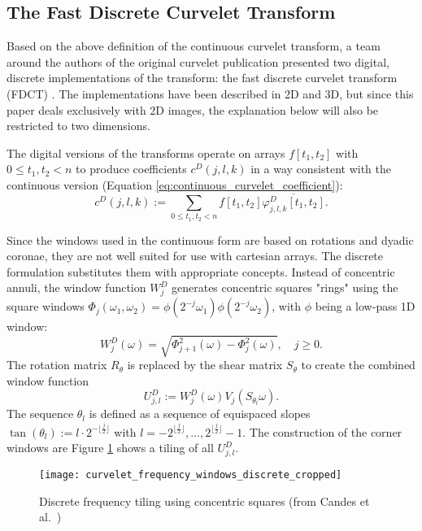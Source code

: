 \subsection{The Fast Discrete Curvelet Transform}\label{sec:background_fdct}

Based on the above definition of the continuous curvelet transform, a team
around the authors of the original curvelet publication presented two digital,
discrete implementations of the transform: the fast discrete curvelet transform
(FDCT) \autocite{candes_fast_2006}. The implementations have been described in
2D and 3D, but since this paper deals exclusively with 2D images, the
explanation below will also be restricted to two dimensions.

The digital versions of the transforms operate on arrays $f[t_1, t_2]$ with $0
\leq t_1, t_2 < n$ to produce coefficients $c^D(j, l, k)$ in a way
consistent with the continuous version (Equation
\ref{eq:continuous_curvelet_coefficient}):
\begin{equation}
    c^D(j, l, k) := \sum_{0 \leq t_1, t_2 < n} f[t_1, t_2] \overline{\varphi_{j, l, k}^D[t_1, t_2]}.
\end{equation}

Since the windows used in the continuous form are based on rotations and dyadic
coronae, they are not well suited for use with cartesian arrays. The discrete
formulation substitutes them with appropriate concepts. Instead of concentric
annuli, the window function $W^D_j$ generates concentric squares "rings" using
the square windows $\Phi_j(\omega_1, \omega_2) = \phi(2^{-j}\omega_1)
\phi(2^{-j}\omega_2)$, with $\phi$ being a low-pass 1D window:
\begin{equation*}
    W_j^D(\omega) = \sqrt{\Phi_{j+1}^2(\omega) - \Phi_j^2(\omega)}, \quad j \geq 0.
\end{equation*}
The rotation matrix $R_{\theta}$ is replaced by the shear matrix $S_{\theta}$
to create the combined window function
\begin{equation*}
    U_{j, l}^D := W_j^D(\omega) V_j(S_{\theta_l}\omega).
\end{equation*}
The sequence $\theta_l$ is defined as a sequence of equispaced slopes
$\tan(\theta_l) := l \cdot 2^{- \lfloor \frac{j}{2} \rfloor}$ with
$l=-2^{\lfloor \frac{j}{2} \rfloor}, \dots, 2^{\lfloor \frac{j}{2} \rfloor} -
1$. The construction of the corner windows are  Figure \ref{fig:curvelet_frequency_windows_discrete} shows a tiling of
all $U_{j, l}^D$.

\begin{figure}[h]
    \centering
        \texttt{[image: curvelet\_frequency\_windows\_discrete\_cropped]}
    \caption[Discrete frequency tiling using concentric squares]{
        Discrete frequency tiling using concentric squares (from Candes et al.\ \autocite{candes_fast_2006})
    }
    \label{fig:curvelet_frequency_windows_discrete}
\end{figure}


